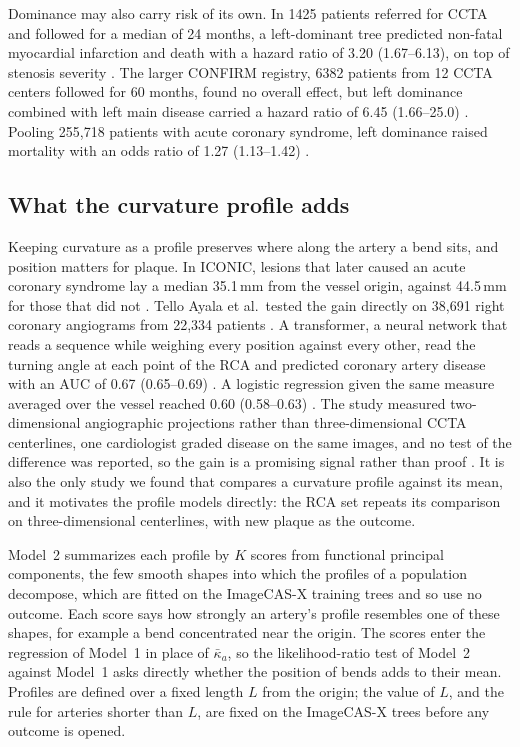 Dominance may also carry risk of its own.
In 1425 patients referred for CCTA and followed for a median of 24 months, a left-dominant tree predicted non-fatal myocardial infarction and death with a hazard ratio of 3.20 (1.67--6.13), on top of stenosis severity \cite{veltman2012dominance}.
The larger CONFIRM registry, 6382 patients from 12 CCTA centers followed for 60 months, found no overall effect, but left dominance combined with left main disease carried a hazard ratio of 6.45 (1.66--25.0) \cite{gebhard2015dominance}.
Pooling 255{,}718 patients with acute coronary syndrome, left dominance raised mortality with an odds ratio of 1.27 (1.13--1.42) \cite{khan2016dominance}.

\subsection{What the curvature profile adds}
\label{sec:risk-profile}

Keeping curvature as a profile preserves where along the artery a bend sits, and position matters for plaque.
In ICONIC, lesions that later caused an acute coronary syndrome lay a median 35.1\,mm from the vessel origin, against 44.5\,mm for those that did not \cite{han2022plaque}.
Tello Ayala et al.\ tested the gain directly on 38{,}691 right coronary angiograms from 22{,}334 patients \cite{telloayala2026tortuosity}.
A transformer, a neural network that reads a sequence while weighing every position against every other, read the turning angle at each point of the RCA and predicted coronary artery disease with an AUC of 0.67 (0.65--0.69) \cite{telloayala2026tortuosity}.
A logistic regression given the same measure averaged over the vessel reached 0.60 (0.58--0.63) \cite{telloayala2026tortuosity}.
The study measured two-dimensional angiographic projections rather than three-dimensional CCTA centerlines, one cardiologist graded disease on the same images, and no test of the difference was reported, so the gain is a promising signal rather than proof \cite{telloayala2026tortuosity}.
It is also the only study we found that compares a curvature profile against its mean, and it motivates the profile models directly: the RCA set repeats its comparison on three-dimensional centerlines, with new plaque as the outcome.

Model~2 summarizes each profile by $K$ scores from functional principal components, the few smooth shapes into which the profiles of a population decompose, which are fitted on the ImageCAS-X training trees and so use no outcome.
Each score says how strongly an artery's profile resembles one of these shapes, for example a bend concentrated near the origin.
The scores enter the regression of Model~1 in place of $\bar\kappa_a$, so the likelihood-ratio test of Model~2 against Model~1 asks directly whether the position of bends adds to their mean.
Profiles are defined over a fixed length $L$ from the origin; the value of $L$, and the rule for arteries shorter than $L$, are fixed on the ImageCAS-X trees before any outcome is opened.

